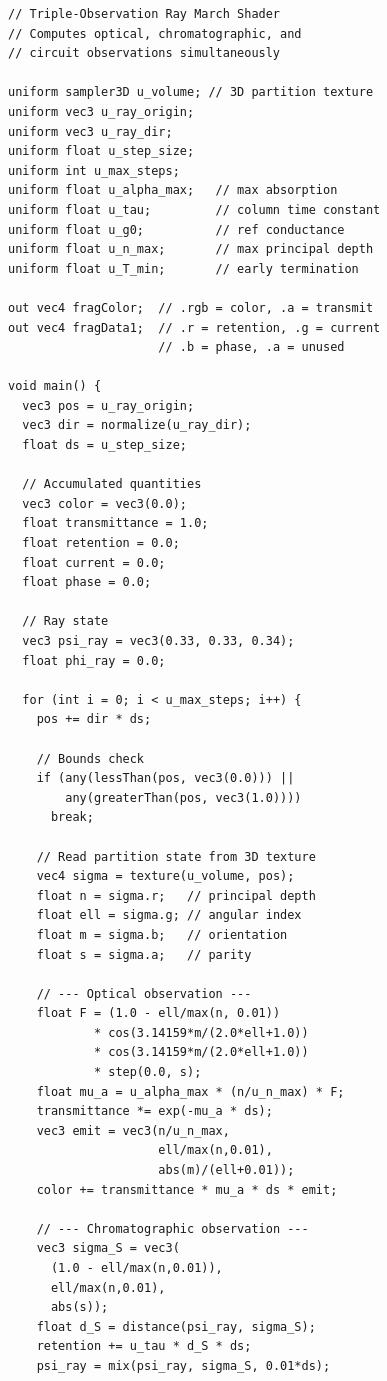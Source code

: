 \documentclass[11pt,twocolumn,a4paper]{article}
\begin{document}
\begin{lstlisting}[style=glsl,caption={Triple-observation ray march
  fragment shader (GLSL pseudocode)},
  label={lst:ray-march}]
// Triple-Observation Ray March Shader
// Computes optical, chromatographic, and
// circuit observations simultaneously

uniform sampler3D u_volume; // 3D partition texture
uniform vec3 u_ray_origin;
uniform vec3 u_ray_dir;
uniform float u_step_size;
uniform int u_max_steps;
uniform float u_alpha_max;   // max absorption
uniform float u_tau;         // column time constant
uniform float u_g0;          // ref conductance
uniform float u_n_max;       // max principal depth
uniform float u_T_min;       // early termination

out vec4 fragColor;  // .rgb = color, .a = transmit
out vec4 fragData1;  // .r = retention, .g = current
                     // .b = phase, .a = unused

void main() {
  vec3 pos = u_ray_origin;
  vec3 dir = normalize(u_ray_dir);
  float ds = u_step_size;

  // Accumulated quantities
  vec3 color = vec3(0.0);
  float transmittance = 1.0;
  float retention = 0.0;
  float current = 0.0;
  float phase = 0.0;

  // Ray state
  vec3 psi_ray = vec3(0.33, 0.33, 0.34);
  float phi_ray = 0.0;

  for (int i = 0; i < u_max_steps; i++) {
    pos += dir * ds;

    // Bounds check
    if (any(lessThan(pos, vec3(0.0))) ||
        any(greaterThan(pos, vec3(1.0))))
      break;

    // Read partition state from 3D texture
    vec4 sigma = texture(u_volume, pos);
    float n = sigma.r;   // principal depth
    float ell = sigma.g; // angular index
    float m = sigma.b;   // orientation
    float s = sigma.a;   // parity

    // --- Optical observation ---
    float F = (1.0 - ell/max(n, 0.01))
            * cos(3.14159*m/(2.0*ell+1.0))
            * cos(3.14159*m/(2.0*ell+1.0))
            * step(0.0, s);
    float mu_a = u_alpha_max * (n/u_n_max) * F;
    transmittance *= exp(-mu_a * ds);
    vec3 emit = vec3(n/u_n_max,
                     ell/max(n,0.01),
                     abs(m)/(ell+0.01));
    color += transmittance * mu_a * ds * emit;

    // --- Chromatographic observation ---
    vec3 sigma_S = vec3(
      (1.0 - ell/max(n,0.01)),
      ell/max(n,0.01),
      abs(s));
    float d_S = distance(psi_ray, sigma_S);
    retention += u_tau * d_S * ds;
    psi_ray = mix(psi_ray, sigma_S, 0.01*ds);


\end{lstlisting}
\end{document}
